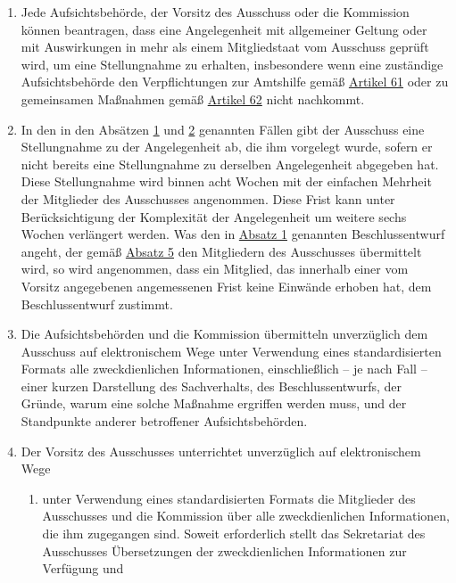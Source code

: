 \begin{enumerate}
  \item Jede Aufsichtsbehörde, der Vorsitz des Ausschuss oder die Kommission können beantragen, dass eine Angelegenheit
   mit allgemeiner Geltung oder mit Auswirkungen in mehr als einem Mitgliedstaat vom Ausschuss geprüft wird, um eine
   Stellungnahme zu erhalten, insbesondere wenn eine zuständige Aufsichtsbehörde den Verpflichtungen zur Amtshilfe
   gemäß \hyperref[ch:61]{Artikel 61} oder zu gemeinsamen Maßnahmen gemäß \hyperref[ch:62]{Artikel 62} nicht nachkommt.
  \label{itm:64-2}

  \item In den in den Absätzen \hyperref[itm:64-1]{1} und \hyperref[itm:64-2]{2} genannten Fällen gibt der Ausschuss
   eine Stellungnahme zu der Angelegenheit ab, die ihm vorgelegt wurde, sofern er nicht bereits eine Stellungnahme zu
   derselben Angelegenheit abgegeben hat. Diese Stellungnahme wird binnen acht Wochen mit der einfachen Mehrheit der
   Mitglieder des Ausschusses angenommen. Diese Frist kann unter Berücksichtigung der Komplexität der Angelegenheit um
   weitere sechs Wochen verlängert werden. Was den in \hyperref[itm:64-1]{Absatz 1} genannten Beschlussentwurf angeht,
   der gemäß \hyperref[itm:64-5]{Absatz 5} den Mitgliedern des Ausschusses übermittelt wird, so wird angenommen, dass
   ein Mitglied, das innerhalb einer vom Vorsitz angegebenen angemessenen Frist keine Einwände erhoben hat, dem
   Beschlussentwurf zustimmt.
  \label{itm:64-3}

  \item Die Aufsichtsbehörden und die Kommission übermitteln unverzüglich dem Ausschuss auf elektronischem Wege unter
   Verwendung eines standardisierten Formats alle zweckdienlichen Informationen, einschließlich -- je nach Fall --
   einer kurzen Darstellung des Sachverhalts, des Beschlussentwurfs, der Gründe, warum eine solche Maßnahme ergriffen
   werden muss, und der Standpunkte anderer betroffener Aufsichtsbehörden.
  \label{itm:64-4}

  \item Der Vorsitz des Ausschusses unterrichtet unverzüglich auf elektronischem Wege
  \label{itm:64-5}

  \begin{enumerate}
  
    \item unter Verwendung eines standardisierten Formats die Mitglieder des Ausschusses und die Kommission über alle
     zweckdienlichen Informationen, die ihm zugegangen sind. Soweit erforderlich stellt das Sekretariat des Ausschusses
     Übersetzungen der zweckdienlichen Informationen zur Verfügung und
    \label{itm:64-5a}


\end{enumerate}
\end{enumerate}
